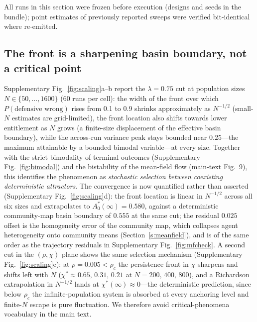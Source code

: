 \documentclass[11pt]{article}
\newcommand{\1}{\mathbf{1}}
\begin{document}
All runs in this section were frozen before execution (designs and seeds in the bundle);
point estimates of previously reported sweeps were verified bit-identical where re-emitted.

\subsection{The front is a sharpening basin boundary, not a critical point}
Supplementary Fig.~\ref{fig:scaling}a--b report the $\lambda=0.75$ cut at population sizes
$N\in\{50,\dots,1600\}$ (60 runs per cell): the width of the front over which
$P(\text{defensive wrong})$ rises from 0.1 to 0.9 shrinks approximately as $N^{-1/2}$
(small-$N$ estimates are grid-limited), the front location also shifts towards lower
entitlement as $N$ grows (a finite-size displacement of the effective basin boundary),
while the across-run variance peak stays bounded near $0.25$---the maximum attainable by a
bounded bimodal variable---at every size. Together with the strict bimodality of terminal
outcomes (Supplementary Fig.~\ref{fig:bimodal}) and the bistability of the mean-field flow
(main-text Fig.~9), this identifies the phenomenon as \emph{stochastic selection between
coexisting deterministic attractors}. The convergence is now quantified rather than
asserted (Supplementary Fig.~\ref{fig:scaling}d): the front location is linear in
$N^{-1/2}$ across all six sizes and extrapolates to $A_0^*(\infty)=0.580$, against a
deterministic community-map basin boundary of $0.555$ at the same cut; the residual
$0.025$ offset is the homogeneity error of the community map, which collapses agent
heterogeneity onto community means (Section~\ref{s:meanfield}), and is of the same order as the
trajectory residuals in Supplementary Fig.~\ref{fig:mfcheck}. A second cut in the
$(\rho,\chi)$ plane shows the same selection mechanism (Supplementary
Fig.~\ref{fig:scaling}e): at $\rho=0.005<\rho_c$ the persistence front in $\chi$ sharpens
and shifts left with $N$ ($\chi^*\approx0.65,\,0.31,\,0.21$ at $N=200,\,400,\,800$), and a
Richardson extrapolation in $N^{-1/2}$ lands at $\chi^*(\infty)\approx0$---the
deterministic prediction, since below $\rho_c$ the infinite-population system is absorbed
at every anchoring level and finite-$N$ escape is pure fluctuation. We therefore avoid
critical-phenomena vocabulary in the main text.
\end{document}
